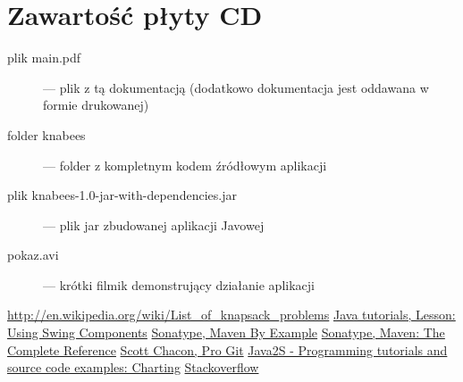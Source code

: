 \documentclass[a4paper,12pt,notitlepage]{mwrep}
\begin{document}
\addtocounter{page}{-1}

\appendix
\chapter*{Zawartość płyty CD}
\begin{description}
	\item[plik main.pdf]	 --- plik z tą dokumentacją (dodatkowo dokumentacja jest oddawana w formie drukowanej)
	\item[folder knabees]	 --- folder z kompletnym kodem źródłowym aplikacji
	\item[plik knabees-1.0-jar-with-dependencies.jar]	 --- plik jar zbudowanej aplikacji Javowej
	\item[pokaz.avi]	 --- krótki filmik demonstrujący działanie aplikacji
\end{description}

\begin{thebibliography}{9}

	\href{http://en.wikipedia.org/wiki/List_of_knapsack_problems}{http://en.wikipedia.org/wiki/List\_of\_knapsack\_problems}
	\href{http://docs.oracle.com/javase/tutorial/uiswing/components/index.html}{Java tutorials, Lesson: Using Swing Components}
	\href{http://www.sonatype.com/Support/Books/Maven-By-Example}{Sonatype, Maven By Example}
	\href{http://www.sonatype.com/Support/Books/Maven-The-Complete-Reference}{Sonatype, Maven: The Complete Reference}
	\href{http://git-scm.com/book/}{Scott Chacon, Pro Git}
	\href{http://www.java2s.com/Code/Java/Chart/CatalogChart.htm}{Java2S - Programming tutorials and source code examples: Charting}
	\href{http://stackoverflow.com/}{Stackoverflow}

\end{thebibliography}


\listoffigures


\label{LastPage}
\end{document}
